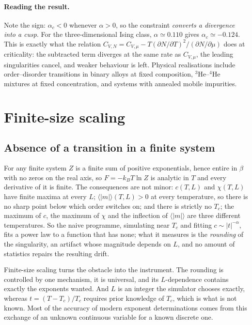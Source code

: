 \documentclass[10pt,a4paper]{article}
\theoremstyle{remark}
\begin{document}
\paragraph{Reading the result.} Note the sign: $\alpha_c<0$ whenever $\alpha>0$,
so the constraint \emph{converts a divergence into a cusp}. For the
three-dimensional Ising class, $\alpha\simeq0.110$ gives
$\alpha_c\simeq-0.124$. This is exactly what the relation
$C_{V,N}=C_{V,\mu}-T(\partial N/\partial T)^2/(\partial N/\partial\mu)$ does at
criticality: the subtracted term diverges at the same rate as $C_{V,\mu}$, the
leading singularities cancel, and weaker behaviour is left. Physical
realisations include order--disorder transitions in binary alloys at fixed
composition, ${}^3$He--${}^4$He mixtures at fixed concentration, and systems with
annealed mobile impurities.


\section{Finite-size scaling}
\label{app:fss}
\label{sec:fss}

\subsection{Absence of a transition in a finite system}
\label{sec:fss:problem}

For any finite system $Z$ is a finite sum of positive exponentials, hence entire
in $\beta$ with no zeros on the real axis, so $F=-k_BT\ln Z$ is analytic in $T$
and every derivative of it is finite. The consequences are not minor:
$c(T,L)$ and $\chi(T,L)$ have finite maxima at every $L$;
$\langle|m|\rangle(T,L)>0$ at every temperature, so there is no sharp point below
which order switches on; and there is strictly no $T_c$; the maximum of $c$,
the maximum of $\chi$ and the inflection of $\langle|m|\rangle$ are three
different temperatures. So the naive programme, simulating near $T_c$ and fitting
$c\sim|t|^{-\alpha}$, fits a power law to a function that has none; what it
measures is the \emph{rounding} of the singularity, an artifact whose magnitude
depends on $L$, and no amount of statistics repairs the resulting drift.

Finite-size scaling turns the obstacle into the instrument. The rounding is
controlled by one mechanism, it is universal, and its $L$-dependence contains
exactly the exponents wanted. And $L$ is an integer the simulator chooses
exactly, whereas $t=(T-T_c)/T_c$ requires prior knowledge of $T_c$, which is
what is not known. Most of the accuracy of modern exponent determinations comes
from this exchange of an unknown continuous variable for a known discrete one.
\end{document}
